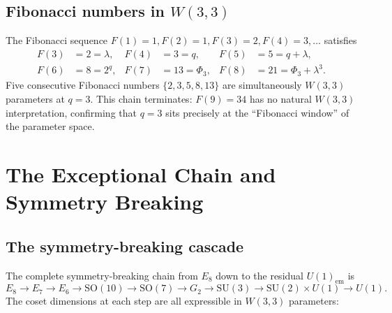 \subsection{Fibonacci numbers in $W(3,3)$}

The Fibonacci sequence $F(1)=1, F(2)=1, F(3)=2, F(4)=3, \ldots$ satisfies
\begin{equation}
  \label{eq:fibonacci}
  \begin{aligned}
    F(3) &= 2 = \lambda, &
    F(4) &= 3 = q, &
    F(5) &= 5 = q+\lambda,\\
    F(6) &= 8 = 2^q, &
    F(7) &= 13 = \Phi_3, &
    F(8) &= 21 = \Phi_3 + \lambda^3.
  \end{aligned}
\end{equation}
Five consecutive Fibonacci numbers $\{2,3,5,8,13\}$ are simultaneously
$W(3,3)$ parameters at $q=3$.  This chain terminates: $F(9)=34$ has no
natural $W(3,3)$ interpretation, confirming that $q=3$ sits precisely at
the ``Fibonacci window'' of the parameter space.

\section{The Exceptional Chain and Symmetry Breaking}
\label{sec:exceptional}

\subsection{The symmetry-breaking cascade}

The complete symmetry-breaking chain from $E_8$ down to the residual
$U(1)_{\mathrm{em}}$ is
\begin{equation}
  \label{eq:breaking_chain}
  E_8 \to E_7 \to E_6 \to \mathrm{SO}(10) \to \mathrm{SO}(7)
      \to G_2 \to \mathrm{SU}(3) \to \mathrm{SU}(2)\times U(1) \to U(1).
\end{equation}
The coset dimensions at each step are all expressible in $W(3,3)$
parameters:

